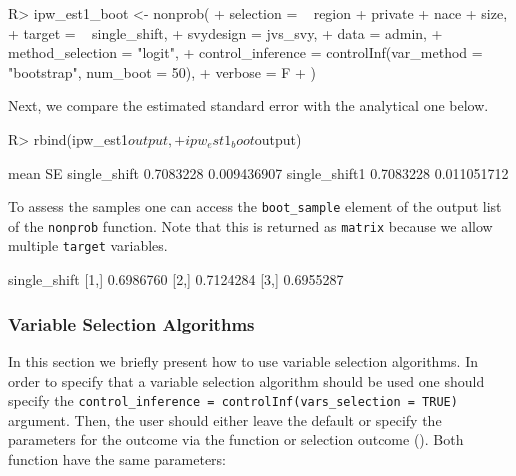 \documentclass[
]{jss}
\begin{document}
\begin{CodeChunk}
\begin{CodeInput}
R> ipw_est1_boot <- nonprob(
+   selection = ~ region + private + nace + size,
+   target = ~ single_shift,
+   svydesign = jvs_svy,
+   data = admin,
+   method_selection = "logit",
+   control_inference = controlInf(var_method = "bootstrap", num_boot = 50),
+   verbose = F
+ )
\end{CodeInput}
\end{CodeChunk}

Next, we compare the estimated standard error with the analytical one
below.

\begin{CodeChunk}
\begin{CodeInput}
R> rbind(ipw_est1$output,
+       ipw_est1_boot$output)
\end{CodeInput}
\begin{CodeOutput}
                   mean          SE
single_shift  0.7083228 0.009436907
single_shift1 0.7083228 0.011051712
\end{CodeOutput}
\end{CodeChunk}

To assess the samples one can access the \texttt{boot\_sample} element
of the output list of the \texttt{nonprob} function. Note that this is
returned as \texttt{matrix} because we allow multiple \texttt{target}
variables.

\begin{CodeChunk}
\begin{CodeOutput}
     single_shift
[1,]    0.6986760
[2,]    0.7124284
[3,]    0.6955287
\end{CodeOutput}
\end{CodeChunk}

\subsubsection{Variable Selection
Algorithms}\label{variable-selection-algorithms}

In this section we briefly present how to use variable selection
algorithms. In order to specify that a variable selection algorithm
should be used one should specify the
\texttt{control\_inference\ =\ controlInf(vars\_selection\ =\ TRUE)}
argument. Then, the user should either leave the default or specify the
parameters for the outcome via the  function or
selection outcome (). Both function have the same
parameters:
\end{document}
